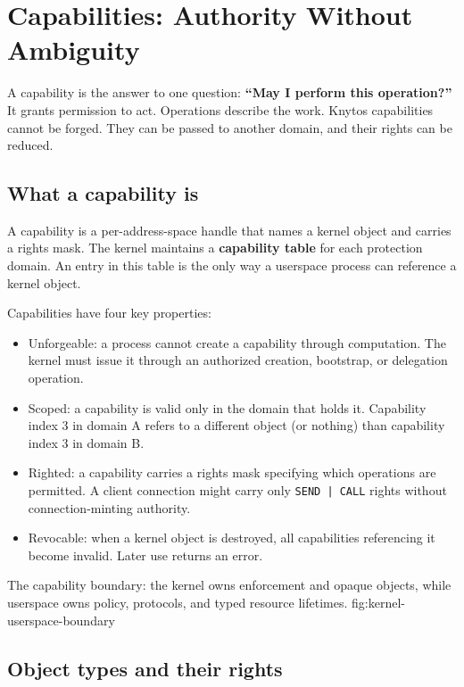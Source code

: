 \chapter{Capabilities: Authority Without Ambiguity}
\label{chap:capabilities}

A capability is the answer to one question: \textbf{``May I perform this
operation?''} It grants permission to act. Operations describe the work.
Knytos capabilities cannot be forged. They can be passed to another domain,
and their rights can be reduced.

\section{What a capability is}

A capability is a per-address-space handle that names a kernel object and carries
a rights mask. The kernel maintains a \textbf{capability table} for each protection
domain. An entry in this table is the only way a userspace process can reference a
kernel object.

Capabilities have four key properties:

\begin{itemize}
    \item Unforgeable: a process cannot create a capability through
        computation. The kernel must issue it through an authorized creation,
        bootstrap, or delegation operation.
    \item Scoped: a capability is valid only in the domain that holds it.
        Capability index 3 in domain A refers to a different object (or nothing)
        than capability index 3 in domain B.
    \item Righted: a capability carries a rights mask specifying which
        operations are permitted. A client connection might carry only
        \texttt{SEND | CALL} rights without connection-minting authority.
    \item Revocable: when a kernel object is destroyed, all capabilities
        referencing it become invalid. Later use returns an error.
\end{itemize}

    {The capability boundary: the kernel owns enforcement and opaque objects, while
    userspace owns policy, protocols, and typed resource lifetimes.}
    {fig:kernel-userspace-boundary}

\section{Object types and their rights}

